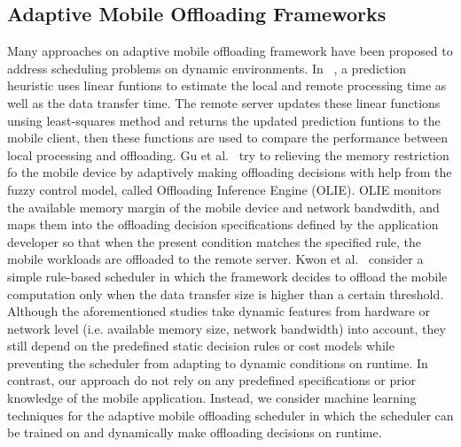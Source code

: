 \documentclass[10pt, conference, compsocconf]{IEEEtran}
\begin{document}
\subsection{Adaptive Mobile Offloading Frameworks}
%
Many approaches on adaptive mobile offloading framework have been
proposed to address scheduling problems on dynamic environments.
%
In ~\cite{shigeru}, a prediction heuristic uses linear funtions to
estimate the local and remote processing time as well as the data
transfer time.
%
The remote server updates these linear functions unsing least-squares
method and returns the updated prediction funtions to the mobile client,
then these functions are used to compare the performance between local
processing and offloading.
%
Gu et al.~\cite{xiaohui} try to relieving the memory restriction fo the
mobile device by adaptively making offloading decisions with help from
the fuzzy control model, called Offloading Inference Engine (OLIE).
%
OLIE monitors the available memory margin of the mobile device and
network bandwdith, and maps them into the offloading decision
specifications defined by the application developer so that when the
present condition matches the specified rule, the mobile workloads are
offloaded to the remote server.
%
Kwon et al.~\cite{kwon} consider a simple rule-based
scheduler in which the framework decides to offload the mobile
computation only when the data transfer size is higher than a certain
threshold.\\
%
\indent Although the aforementioned studies take dynamic features
from hardware or network level (i.e. available memory size, network
bandwidth) into account, they still depend on the predefined static
decision rules or cost models while preventing the scheduler from
adapting to dynamic conditions on runtime.
%
In contrast, our approach do not rely on any predefined specifications
or prior knowledge of the mobile application.
%
Instead, we consider machine learning techniques for the adaptive mobile
offloading scheduler in which the scheduler can be trained on and 
dynamically make offloading decisions on runtime. 
%
\end{document}
